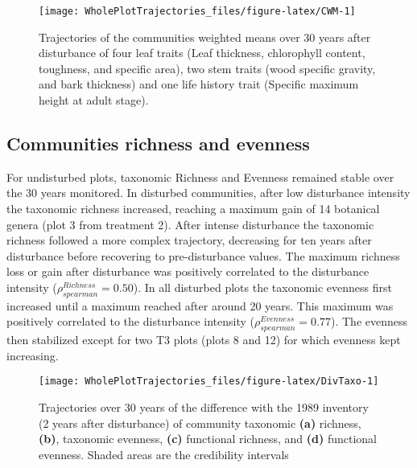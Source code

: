 \documentclass[fleqn,10pt]{ArtEcoFoG} %
\begin{document}
\begin{figure*}

{\centering \texttt{[image: WholePlotTrajectories\_files/figure-latex/CWM-1]} 

}

\caption{Trajectories of the communities weighted means over 30 years after disturbance of four leaf traits (Leaf thickness, chlorophyll content, toughness, and specific area), two stem traits (wood specific gravity, and bark thickness) and one life history trait (Specific maximum height at adult stage). }\label{fig:CWM}
\end{figure*}

\subsection{Communities richness and
evenness}\label{communities-richness-and-evenness}

For undisturbed plots, taxonomic Richness and Evenness remained stable
over the 30 years monitored. In disturbed communities, after low
disturbance intensity the taxonomic richness increased, reaching a
maximum gain of 14 botanical genera (plot 3 from treatment 2). After
intense disturbance the taxonomic richness followed a more complex
trajectory, decreasing for ten years after disturbance before recovering
to pre-disturbance values. The maximum richness loss or gain after
disturbance was positively correlated to the disturbance intensity
(\(\rho_{spearman}^{Richness}=0.50\)). In all disturbed plots the
taxonomic evenness first increased until a maximum reached after around
20 years. This maximum was positively correlated to the disturbance
intensity (\(\rho_{spearman}^{Evenness}=0.77\)). The evenness then
stabilized except for two T3 plots (plots 8 and 12) for which evenness
kept increasing.

\begin{figure*}

{\centering \texttt{[image: WholePlotTrajectories\_files/figure-latex/DivTaxo-1]} 

}

\caption{Trajectories over 30 years of the difference with the 1989 inventory (2 years after disturbance) of community taxonomic \textbf{(a)} richness, \textbf{(b)}, taxonomic evenness, \textbf{(c)} functional richness, and \textbf{(d)} functional evenness. Shaded areas are the credibility intervals }\label{fig:DivTaxo}
\end{figure*}
\end{document}
